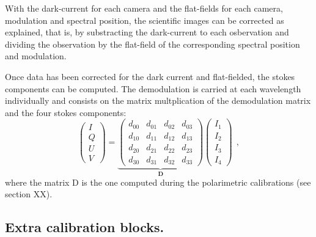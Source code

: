 With the dark-current for each camera and the flat-fields for each camera, modulation and spectral position, the scientific images can be corrected as explained, that is, by substracting the dark-current to each osbervation and dividing the observation by the flat-field of the corresponding spectral position and modulation. 

Once data has been corrected for the dark current and flat-fielded, the stokes components can be computed. The demodulation is carried at each wavelength individually and consists on the matrix multplication of the demodulation matrix and the four stokes components:
\begin{equation}
  \begin{pmatrix}
  I \\
  Q \\
  U \\
  V
  \end{pmatrix} = 
  \underbrace{\begin{pmatrix} 
      d _ {00} & d _ {01} & d _ {02} & d _ {03} \\ 
      d _ {10} & d _ {11} & d _ {12} & d _ {13} \\
      d _ {20} & d _ {21} & d _ {22} & d _ {23} \\
      d _ {30} & d _ {31} & d _ {32} & d _ {33} 
  \end{pmatrix}}_ {\textbf{D}}
  \begin{pmatrix}
    I _ {1} \\
    I _ {2} \\
    I _ {3} \\
    I _ {4}
    \end{pmatrix} \ \ , 
    \label{pipeline: Demod}
\end{equation}
where the matrix D is the one computed during the polarimetric calibrations (see section XX).








\subsection{Extra calibration blocks.}



